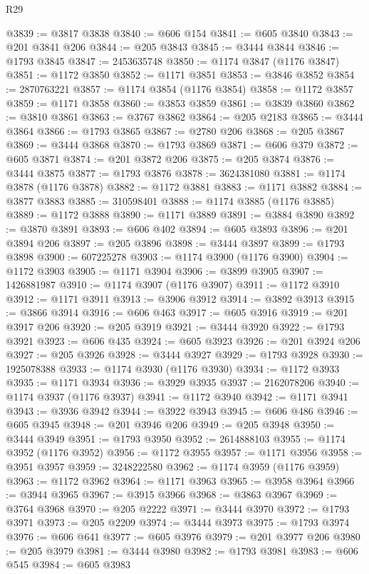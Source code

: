 \begin{lexlean}{R29}
\begin{coremodule}
@3839 := @3817 @3838
@3840 := @606 @154
@3841 := @605 @3840
@3843 := @201 @3841 @206
@3844 := @205 @3843
@3845 := @3444 @3844
@3846 := @1793 @3845
@3847 := 2453635748
@3850 := @1174 @3847 (@1176 @3847)
@3851 := @1172 @3850
@3852 := @1171 @3851
@3853 := @3846 @3852
@3854 := 2870763221
@3857 := @1174 @3854 (@1176 @3854)
@3858 := @1172 @3857
@3859 := @1171 @3858
@3860 := @3853 @3859
@3861 := @3839 @3860
@3862 := @3810 @3861
@3863 := @3767 @3862
@3864 := @205 @2183
@3865 := @3444 @3864
@3866 := @1793 @3865
@3867 := @2780 @206
@3868 := @205 @3867
@3869 := @3444 @3868
@3870 := @1793 @3869
@3871 := @606 @379
@3872 := @605 @3871
@3874 := @201 @3872 @206
@3875 := @205 @3874
@3876 := @3444 @3875
@3877 := @1793 @3876
@3878 := 3624381080
@3881 := @1174 @3878 (@1176 @3878)
@3882 := @1172 @3881
@3883 := @1171 @3882
@3884 := @3877 @3883
@3885 := 310598401
@3888 := @1174 @3885 (@1176 @3885)
@3889 := @1172 @3888
@3890 := @1171 @3889
@3891 := @3884 @3890
@3892 := @3870 @3891
@3893 := @606 @402
@3894 := @605 @3893
@3896 := @201 @3894 @206
@3897 := @205 @3896
@3898 := @3444 @3897
@3899 := @1793 @3898
@3900 := 607225278
@3903 := @1174 @3900 (@1176 @3900)
@3904 := @1172 @3903
@3905 := @1171 @3904
@3906 := @3899 @3905
@3907 := 1426881987
@3910 := @1174 @3907 (@1176 @3907)
@3911 := @1172 @3910
@3912 := @1171 @3911
@3913 := @3906 @3912
@3914 := @3892 @3913
@3915 := @3866 @3914
@3916 := @606 @463
@3917 := @605 @3916
@3919 := @201 @3917 @206
@3920 := @205 @3919
@3921 := @3444 @3920
@3922 := @1793 @3921
@3923 := @606 @435
@3924 := @605 @3923
@3926 := @201 @3924 @206
@3927 := @205 @3926
@3928 := @3444 @3927
@3929 := @1793 @3928
@3930 := 1925078388
@3933 := @1174 @3930 (@1176 @3930)
@3934 := @1172 @3933
@3935 := @1171 @3934
@3936 := @3929 @3935
@3937 := 2162078206
@3940 := @1174 @3937 (@1176 @3937)
@3941 := @1172 @3940
@3942 := @1171 @3941
@3943 := @3936 @3942
@3944 := @3922 @3943
@3945 := @606 @486
@3946 := @605 @3945
@3948 := @201 @3946 @206
@3949 := @205 @3948
@3950 := @3444 @3949
@3951 := @1793 @3950
@3952 := 2614888103
@3955 := @1174 @3952 (@1176 @3952)
@3956 := @1172 @3955
@3957 := @1171 @3956
@3958 := @3951 @3957
@3959 := 3248222580
@3962 := @1174 @3959 (@1176 @3959)
@3963 := @1172 @3962
@3964 := @1171 @3963
@3965 := @3958 @3964
@3966 := @3944 @3965
@3967 := @3915 @3966
@3968 := @3863 @3967
@3969 := @3764 @3968
@3970 := @205 @2222
@3971 := @3444 @3970
@3972 := @1793 @3971
@3973 := @205 @2209
@3974 := @3444 @3973
@3975 := @1793 @3974
@3976 := @606 @641
@3977 := @605 @3976
@3979 := @201 @3977 @206
@3980 := @205 @3979
@3981 := @3444 @3980
@3982 := @1793 @3981
@3983 := @606 @545
@3984 := @605 @3983

\end{coremodule}
\end{lexlean}
